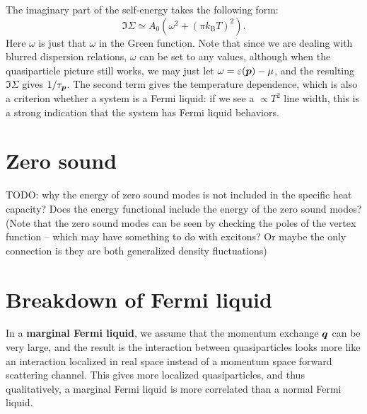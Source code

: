 \documentclass[hyperref, a4paper]{article}
\newcommand*{\concept}[1]{{\textbf{#1}}}
\newcommand*{\kB}{k_{\text{B}}}
\begin{document}
The imaginary part of the self-energy takes the following form: 
\begin{equation}
    \Im \Sigma \simeq A_0 (\omega^2 + (\pi \kB T)^2).
\end{equation}
Here $\omega$ is just that $\omega$ in the Green function.
Note that since we are dealing with blurred dispersion relations, 
$\omega$ can be set to any values, 
although when the quasiparticle picture still works, 
we may just let $\omega = \varepsilon(\vb*{p}) - \mu$, 
and the resulting $\Im \Sigma$ gives $1 / {\tau_{\vb*{p}}}$.
The second term gives the temperature dependence,
which is also a criterion whether a system is a Fermi liquid: 
if we see a $\propto T^2$ line width,
this is a strong indication that the system 
has Fermi liquid behaviors.

\section{Zero sound}

TODO: why the energy of zero sound modes is not included in the specific heat capacity?
Does the energy functional include the energy of the zero sound modes?
(Note that the zero sound modes can be seen by checking the poles of the vertex function 
-- which may have something to do with excitons? 
Or maybe the only connection is they are both generalized density fluctuations)

\section{Breakdown of Fermi liquid}

In a \concept{marginal Fermi liquid}, 
we assume that the momentum exchange $\vb*{q}$ can be very large, 
and the result is the interaction between quasiparticles 
looks more like an interaction localized in real space 
instead of a momentum space forward scattering channel.
This gives more localized quasiparticles,
and thus qualitatively, 
a marginal Fermi liquid is more correlated than 
a normal Fermi liquid.
\end{document}
